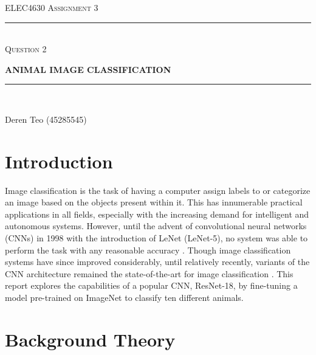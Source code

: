 \begin{titlepage}
  \centering

  \textsc{ELEC4630 Assignment 3}\\
  \vspace{9cm}

  \rule{\linewidth}{0.5pt}\\

  \vspace{1em}
  \LARGE\textsc{Question 2}\\
  \vspace{1em}

  \LARGE\uppercase{\textbf{{Animal Image Classification}}}\\

  \rule{\linewidth}{2pt}\\

  \vfill

  \normalsize{Deren Teo (45285545)}
  \vspace{1cm}

\end{titlepage}

\section{Introduction}

Image classification is the task of having a computer assign labels to or categorize an image based on the objects present within it. This has innumerable practical applications in all fields, especially with the increasing demand for intelligent and autonomous systems. However, until the advent of convolutional neural networks (CNNs) in 1998 with the introduction of LeNet (LeNet-5), no system was able to perform the task with any reasonable accuracy \cite{amidi_2017}. Though image classification systems have since improved considerably, until relatively recently, variants of the CNN architecture remained the state-of-the-art for image classification \cite{paperswithcode_2023}. This report explores the capabilities of a popular CNN, ResNet-18, by fine-tuning a model pre-trained on ImageNet \cite{stanfordvisionlab_2020} to classify ten different animals.

\section{Background Theory}


